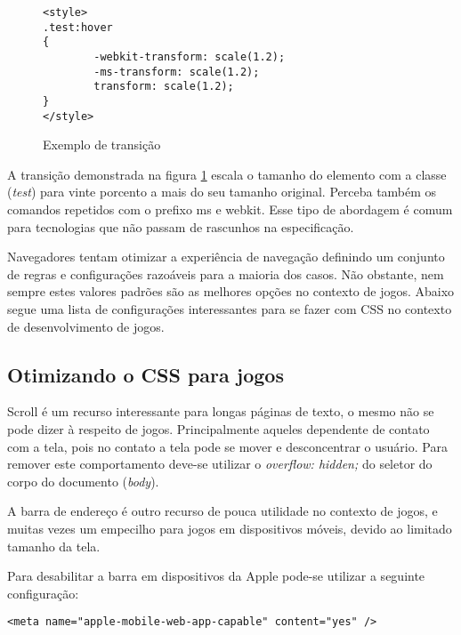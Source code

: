 \begin{figure}
\centering
\begin{verbatim}
<style>
.test:hover
{
        -webkit-transform: scale(1.2);
        -ms-transform: scale(1.2);
        transform: scale(1.2);
}
</style>
\end{verbatim}
\caption{Exemplo de transição}
\label{fig:CSSTransition}
\end{figure}

A transição demonstrada na figura \ref{fig:CSSTransition} escala o
tamanho do elemento com a classe (\textit{test}) para vinte porcento a
mais do seu tamanho original. Perceba também os comandos repetidos com
o prefixo ms e webkit. Esse tipo de abordagem é comum para tecnologias
que não passam de rascunhos na especificação.

Navegadores tentam otimizar a experiência de navegação definindo
um conjunto de regras e configurações razoáveis para a maioria dos
casos. Não obstante, nem sempre estes valores padrões são as melhores
opções no contexto de jogos. Abaixo segue uma lista de configurações
interessantes para se fazer com CSS no contexto de desenvolvimento de
jogos.

\subsection{Otimizando o CSS para jogos}

Scroll é um recurso interessante para longas páginas de texto,
o mesmo não se pode dizer à respeito de jogos.
Principalmente aqueles dependente de contato com a tela, pois
no contato a tela pode se mover e desconcentrar o usuário. Para
remover este comportamento deve-se utilizar o \textit{overflow:
hidden;} do seletor do corpo do documento (\textit{body}).

A barra de endereço é outro recurso de pouca utilidade no contexto de
jogos, e muitas vezes um empecilho para jogos em dispositivos móveis,
devido ao limitado tamanho da tela.

Para desabilitar a barra em dispositivos da Apple pode-se utilizar a
seguinte configuração:

\begin{verbatim}
<meta name="apple-mobile-web-app-capable" content="yes" />
\end{verbatim}

